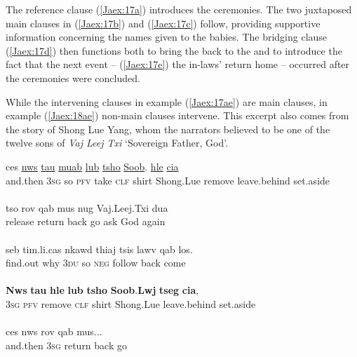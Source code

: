 \documentclass[output=paper]{LSP/langsci}
\begin{document}
\noindent
The reference clause (\ref{Jaex:17a}) introduces the ceremonies. The two juxtaposed main clauses in (\ref{Jaex:17b}) and (\ref{Jaex:17c}) follow, providing supportive information concerning the names given to the babies. The bridging clause (\ref{Jaex:17d}) then functions both to bring the  back to the  and to introduce the fact that the next event – (\ref{Jaex:17e}) the in-laws’ return home – occurred after the ceremonies were concluded.
 
While the intervening clauses in example (\ref{Jaex:17ae}) are main clauses, in example (\ref{Jaex:18ae}) non-main clauses intervene. This excerpt also comes from the story of Shong Lue Yang, whom the narrators believed to be one of the twelve sons of \textit{Vaj Leej Txi } `Sovereign Father, God'.
 
\begin{exe}
\ex \label{Jaex:18ae}
\begin{xlist}
\ex \label{Jaex:18a}
\gll ces \underline{nws} \underline{} \underline{tau} \underline{muab} \underline{lub} \underline{tsho}     \underline{Soob}.\underline{} \underline{hle} \underline{}     \underline{cia}\\
and.then \textsc{3sg} so  \textsc{pfv} take  \textsc{clf} shirt Shong.Lue remove leave.behind set.aside \\
\glt {}\\
\ex \label{Jaex:18b}
\gll tso rov qab mus nug Vaj.Leej.Txi dua\\
release return back go  ask God again\\ 
\glt {}\\
\ex \label{Jaex:18c}
\gll seb  tim.li.cas  nkawd thiaj tsis lawv  qab los.\\		
find.out why \textsc{3du} so \textsc{neg} follow back come\\ 
\glt {}\\
\ex \label{Jaex:18d}
\gll \textbf{Nws} \textbf{tau}  \textbf{hle} \textbf{lub} \textbf{tsho} \textbf{Soob}.\textbf{Lwj} \textbf{tseg} \textbf{cia},\\		           
 \textsc{3sg} \textsc{pfv} remove \textsc{clf} shirt Shong.Lue leave.behind set.aside\\
\glt {}\\
\ex \label{Jaex:18e}
\gll ces nws rov qab mus...\\     	      
and.then \textsc{3sg} return back go\\
\glt {} \citep[][16]{vang90}
\end{xlist}
\end{exe}
\end{document}
